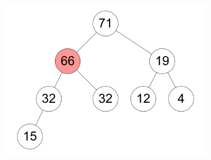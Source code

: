 \documentclass[11pt,a4paper]{article}
\begin{document}
\begin{loesung}
\begin{enumerate}
\begin{figure}[h!]
\begin{subfigure}[b]{0.23\textwidth}
                \includegraphics[width=\textwidth]{img/d7}
            \end{subfigure}
        \end{figure}
        \FloatBarrier


    \end{enumerate}
    
\end{loesung}
\end{document}
